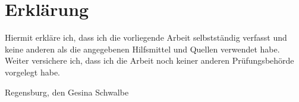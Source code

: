 \chapter*{Erklärung}
\thispagestyle{empty}
Hiermit erkläre ich, dass ich die vorliegende Arbeit selbstständig
verfasst und keine anderen als die angegebenen Hilfsmittel und Quellen
verwendet habe. Weiter versichere ich, dass ich die Arbeit noch keiner
anderen Prüfungsbehörde vorgelegt habe.

\vspace*{5em}
Regensburg, den \abgabedatum
\hfill
Gesina Schwalbe


